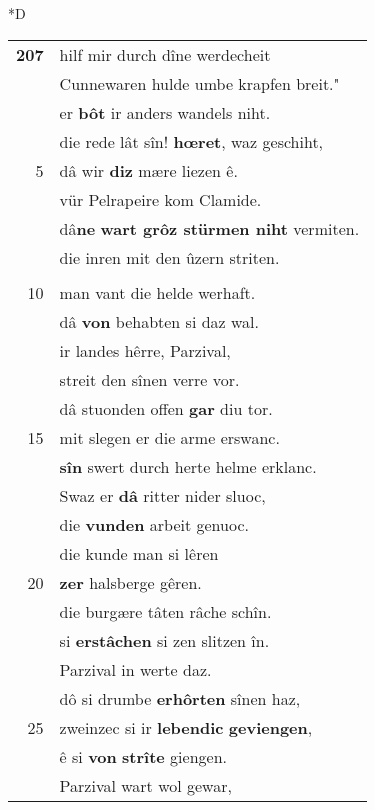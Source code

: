 \documentclass[8pt,a4paper,notitlepage]{article}
\begin{document}
\begin{table}[ht]
\begin{minipage}[t]{0.5\linewidth}
\small
\begin{center}*D
\end{center}
\begin{tabular}{rl}
\textbf{207} & hilf mir durch dîne werdecheit\\ 
 & Cunnewaren hulde umbe krapfen breit."\\ 
 & er \textbf{bôt} ir anders wandels niht.\\ 
 & die rede lât sîn! \textbf{hœret}, waz geschiht,\\ 
5 & dâ wir \textbf{diz} mære liezen ê.\\ 
 & vür Pelrapeire kom Clamide.\\ 
 & dâ\textbf{ne} \textbf{wart grôz stürmen niht} vermiten.\\ 
 & die inren mit den ûzern striten.\\ 
 & \textit{\begin{large}S\end{large}}i heten trôst unt kraft.\\ 
10 & man vant die helde werhaft.\\ 
 & dâ \textbf{von} behabten si daz wal.\\ 
 & ir landes hêrre, Parzival,\\ 
 & streit den sînen verre vor.\\ 
 & dâ stuonden offen \textbf{gar} diu tor.\\ 
15 & mit slegen er die arme erswanc.\\ 
 & \textbf{sîn} swert durch herte helme erklanc.\\ 
 & Swaz er \textbf{dâ} ritter nider sluoc,\\ 
 & die \textbf{vunden} arbeit genuoc.\\ 
 & die kunde man si lêren\\ 
20 & \textbf{zer} halsberge gêren.\\ 
 & die burgære tâten râche schîn.\\ 
 & si \textbf{erstâchen} si zen slitzen în.\\ 
 & Parzival in werte daz.\\ 
 & dô si drumbe \textbf{erhôrten} sînen haz,\\ 
25 & zweinzec si ir \textbf{lebendic} \textbf{geviengen},\\ 
 & ê si \textbf{von} \textbf{strîte} giengen.\\ 
 & Parzival wart wol gewar,\\ 

\end{tabular}
\end{minipage}
\end{table}
\end{document}
